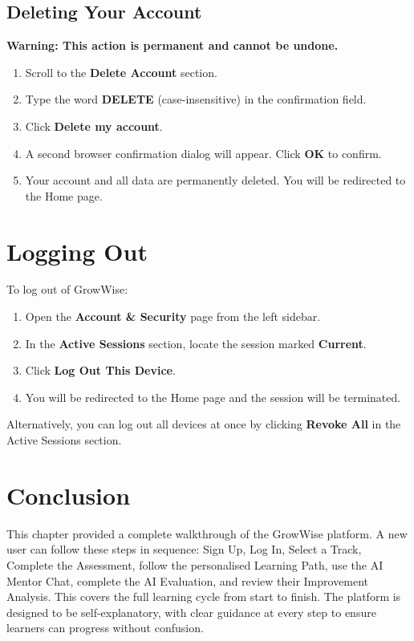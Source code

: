 \documentclass{FastFyp}
\begin{document}
\subsection{Deleting Your Account}
\textbf{Warning: This action is permanent and cannot be undone.}

\begin{enumerate}
    \item Scroll to the \textbf{Delete Account} section.
    \item Type the word \textbf{DELETE} (case-insensitive) in the confirmation field.
    \item Click \textbf{Delete my account}.
    \item A second browser confirmation dialog will appear. Click \textbf{OK} to confirm.
    \item Your account and all data are permanently deleted. You will be redirected to the Home page.
\end{enumerate}

\section{Logging Out}

To log out of GrowWise:

\begin{enumerate}
    \item Open the \textbf{Account \& Security} page from the left sidebar.
    \item In the \textbf{Active Sessions} section, locate the session marked \textbf{Current}.
    \item Click \textbf{Log Out This Device}.
    \item You will be redirected to the Home page and the session will be terminated.
\end{enumerate}

Alternatively, you can log out all devices at once by clicking \textbf{Revoke All} in the Active Sessions section.

\section{Conclusion}

This chapter provided a complete walkthrough of the GrowWise platform. A new user can follow these steps in sequence: Sign Up, Log In, Select a Track, Complete the Assessment, follow the personalised Learning Path, use the AI Mentor Chat, complete the AI Evaluation, and review their Improvement Analysis. This covers the full learning cycle from start to finish. The platform is designed to be self-explanatory, with clear guidance at every step to ensure learners can progress without confusion.
\end{document}
